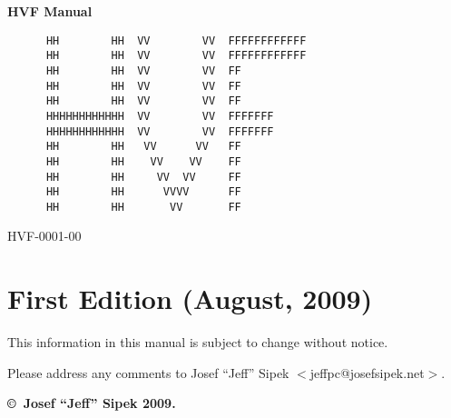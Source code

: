 \begin{titlepage}
\vspace*{0.5in}
\Huge \textbf{HVF Manual}
\normalsize
\vspace{1.4in}
\Large
\begin{verbatim}
      HH        HH  VV        VV  FFFFFFFFFFFF
      HH        HH  VV        VV  FFFFFFFFFFFF
      HH        HH  VV        VV  FF
      HH        HH  VV        VV  FF
      HH        HH  VV        VV  FF
      HHHHHHHHHHHH  VV        VV  FFFFFFF
      HHHHHHHHHHHH  VV        VV  FFFFFFF
      HH        HH   VV      VV   FF
      HH        HH    VV    VV    FF
      HH        HH     VV  VV     FF
      HH        HH      VVVV      FF
      HH        HH       VV       FF
\end{verbatim}
\normalsize
{}
\hfill HVF-0001-00
\newpage
{}
\section*{First Edition (August, 2009)}
This information in this manual is subject to change without notice.

Please address any comments to Josef ``Jeff'' Sipek
$<$jeffpc@josefsipek.net$>$.

\textbf{\copyright\ Josef ``Jeff'' Sipek 2009.}
\end{titlepage}
